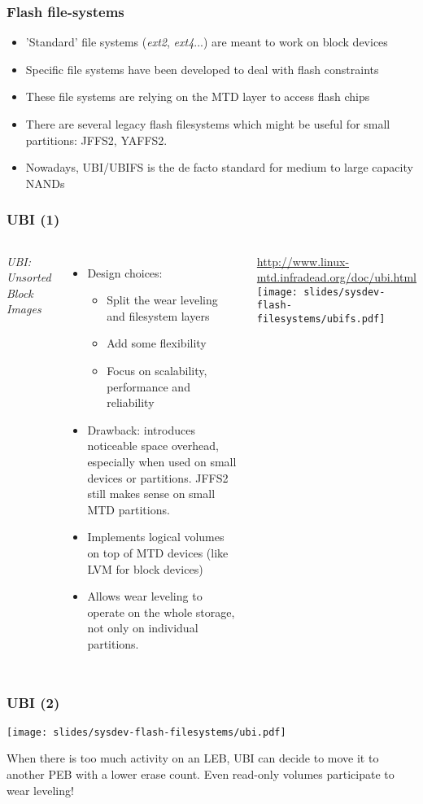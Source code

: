 \begin{frame}
  \frametitle{Flash file-systems}
  \begin{itemize}
  \item 'Standard' file systems ({\em ext2}, {\em ext4}...) are
        meant to work on block devices
  \item Specific file systems have been developed to deal with
        flash constraints
  \item These file systems are relying on the MTD layer to access
    flash chips
  \item There are several legacy flash filesystems which might be
    useful for small partitions: JFFS2, YAFFS2.
  \item Nowadays, UBI/UBIFS is the de facto standard for medium to
    large capacity NANDs
  \end{itemize}
\end{frame}

\begin{frame}
  \frametitle{UBI (1)}
  \begin{columns}[T]
    {\em UBI: Unsorted Block Images}
    \begin{itemize}
    \item Design choices:
      \begin{itemize}
      \item Split the wear leveling and filesystem layers
      \item Add some flexibility
      \item Focus on scalability, performance and reliability
      \end{itemize}
    \item Drawback: introduces noticeable space overhead,
          especially when used on small devices or partitions. JFFS2
          still makes sense on small MTD partitions.
    \item Implements logical volumes on top of MTD devices
          (like LVM for block devices)
    \item Allows wear leveling to operate on the whole storage,
	  not only on individual partitions.
    \end{itemize}
    \url{http://www.linux-mtd.infradead.org/doc/ubi.html}
    \texttt{[image: slides/sysdev-flash-filesystems/ubifs.pdf]}
  \end{columns}
\end{frame}

\begin{frame}
  \frametitle{UBI (2)}
  \begin{center}
    \texttt{[image: slides/sysdev-flash-filesystems/ubi.pdf]}
  \end{center}
  When there is too much activity on an LEB, UBI can decide to move it
  to another PEB with a lower erase count. Even read-only volumes
  participate to wear leveling!
\end{frame}

